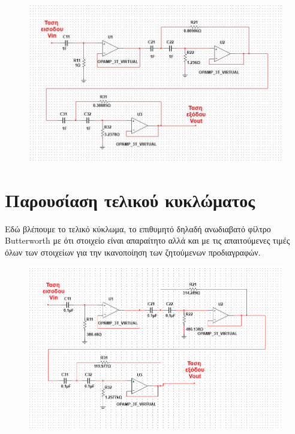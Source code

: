 \documentclass{article}
\begin{document}
{{{ \begin{figure}[h!]
\centering
 	\advance\leftskip-4cm
  \includegraphics[width=200mm,scale=2]{thema4/kanon.jpg}
  
  
 
\end{figure}
\newpage
\section*{Παρουσίαση τελικού κυκλώματος}
   Εδώ βλέπουμε το τελικό κύκλωμα, το επιθυμητό δηλαδή ανωδιαβατό φίλτρο Butterworth με ότι στοιχείο είναι απαραίτητο αλλά και με τις απαιτούμενες τιμές όλων των στοιχείων για την ικανοποίηση των ζητούμενων προδιαγραφών.
    \begin{figure}[h!]
\centering
 \advance\leftskip-4.1cm
  \includegraphics[width=200mm,scale=2]{thema4/teliko.png}
  
  
 
\end{figure} 
\clearpage
}}}
\end{document}
